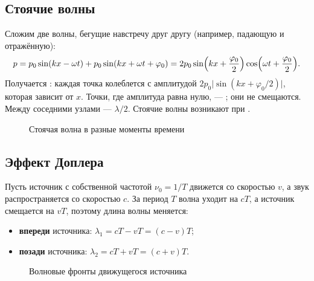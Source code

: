 \documentclass[11pt,a4paper]{article}
\begin{document}
\subsection{Стоячие волны}
Сложим две волны, бегущие навстречу друг другу (например, падающую и отражённую):
\[
p=p_0\sin(kx-\omega t)+p_0\sin(kx+\omega t+\varphi_0)=2p_0\sin\Bigl(kx+\frac{\varphi_0}2\Bigr)\cos\Bigl(\omega t+\frac{\varphi_0}2\Bigr).
\]
Получается : каждая точка колеблется с амплитудой $2p_0\bigl|\sin(kx+\varphi_0/2)\bigr|$, которая зависит от $x$.
Точки, где амплитуда равна нулю, — ; они не смещаются. Между соседними узлами — $\lambda/2$. Стоячие волны возникают
при .

\begin{figure}[H]
\centering
{}
\caption{Стоячая волна в разные моменты времени}
\end{figure}

\subsection{Эффект Доплера}
Пусть источник с собственной частотой $\nu_0=1/T$ движется со скоростью $v$, а звук распространяется со скоростью $c$.
За период $T$ волна уходит на $cT$, а источник смещается на $vT$, поэтому длина волны меняется:
\begin{itemize}
\item \textbf{впереди} источника: $\lambda_1=cT-vT=(c-v)T$;
\item \textbf{позади} источника: $\lambda_2=cT+vT=(c+v)T$.
\end{itemize}

\begin{figure}[H]
\centering
{}
\caption{Волновые фронты движущегося источника}
\end{figure}
\end{document}

